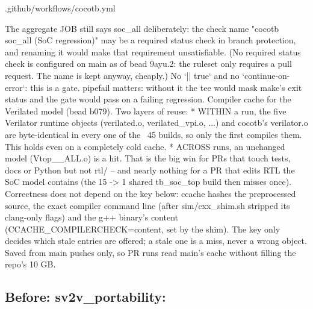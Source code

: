 \begin{relocated}{.github/workflows/cocotb.yml}
\begin{textblock}
The aggregate JOB still says soc_all deliberately: the check name
"cocotb soc_all (SoC regression)" may be a required status check in branch
protection, and renaming it would make that requirement unsatisfiable.
(No required status check is configured on main as of bead 9ayu.2: the ruleset only
requires a pull request.  The name is kept anyway, cheaply.)
No `|| true` and no `continue-on-error`: this is a gate.
pipefail matters: without it the tee would mask make's exit status and
the gate would pass on a failing regression.
Compiler cache for the Verilated model (bead b079).  Two layers of reuse:
 * WITHIN a run, the five Verilator runtime objects (verilated.o, verilated_vpi.o, ...) and
   cocotb's verilator.o are byte-identical in every one of the ~45 builds, so only the
   first compiles them.  This holds even on a completely cold cache.
 * ACROSS runs, an unchanged model (Vtop__ALL.o) is a hit.  That is the big win for PRs that
   touch tests, docs or Python but not rtl/ -- and nearly nothing for a PR that edits RTL
   the SoC model contains (the 15 -> 1 shared tb_soc_top build then misses once).
Correctness does not depend on the key below: ccache hashes the preprocessed source, the
exact compiler command line (after sim/cxx_shim.sh stripped its clang-only flags) and the
g++ binary's content (CCACHE_COMPILERCHECK=content, set by the shim).  The key only
decides which stale entries are offered; a stale one is a miss, never a wrong object.
Saved from main pushes only, so PR runs read main's cache without filling the repo's 10 GB.
\end{textblock}

\subsection*{Before: sv2v\_portability:}


\end{relocated}

